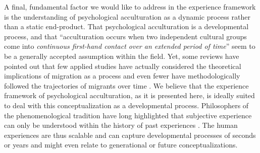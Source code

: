 \documentclass[man, 12pt, a4paper]{apa7}
\begin{document}
A final, fundamental factor we would like to address in the experience framework is the understanding of psychological acculturation as a dynamic process rather than a static end-product. That psychological acculturation is a developmental process, and that ``acculturation occurs when two independent cultural groups come into \textit{continuous first-hand contact over an extended period of time}'' \citep[][186]{Berry1989} seem to be a generally accepted assumption within the field. Yet, some reviews have pointed out that few applied studies have actually considered the theoretical implications of migration as a process and even fewer have methodologically followed the trajectories of migrants over time \citep[][]{Brown2011, Ward2019}. We believe that the experience framework of psychological acculturation, as it is presented here, is ideally suited to deal with this conceptualization as a developmental process. Philosophers of the phenomenological tradition have long highlighted that subjective experience can only be understood within the history of past experiences \citep[e.g.,][]{Heidegger1867}. The human experiences are thus scalable and can capture developmental processes of seconds or years and might even relate to generational or future conceptualizations.
\end{document}
